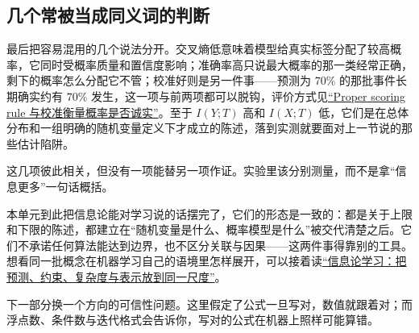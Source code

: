 \subsection{几个常被当成同义词的判断}

最后把容易混用的几个说法分开。交叉熵低意味着模型给真实标签分配了较高概率，它同时受概率质量和置信度影响；准确率高只说最大概率的那一类经常正确，剩下的概率怎么分配它不管；校准好则是另一件事——预测为 \(70\%\) 的那批事件长期确实约有 \(70\%\) 发生，这一项与前两项都可以脱钩，评价方式见\hyperref[sec:11-Mathematical-Statistics/07-Statistical-Decision-and-Reliable-Prediction/04]{``Proper scoring rule 与校准衡量概率是否诚实''}。至于 \(I(Y;T)\) 高和 \(I(X;T)\) 低，它们是在总体分布和一组明确的随机变量定义下才成立的陈述，落到实测就要面对上一节说的那些估计陷阱。

这几项彼此相关，但没有一项能替另一项作证。实验里该分别测量，而不是拿``信息更多''一句话概括。

本单元到此把信息论能对学习说的话摆完了，它们的形态是一致的：都是关于上限和下限的陈述，都建立在``随机变量是什么、概率模型是什么''被交代清楚之后。它们不承诺任何算法能达到边界，也不区分关联与因果——这两件事得靠别的工具。想看同一批概念在机器学习自己的语境里怎样展开，可以接着读\hyperref[ch:119]{``信息论学习：把预测、约束、复杂度与表示放到同一尺度''}。

下一部分换一个方向的可信性问题。这里假定了公式一旦写对，数值就跟着对；而浮点数、条件数与迭代格式会告诉你，写对的公式在机器上照样可能算错。
